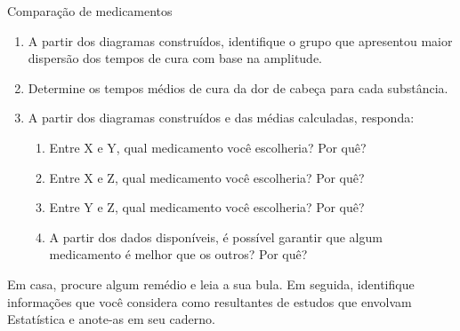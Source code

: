 \begin{task}{ Comparação de medicamentos}
\begin{enumerate}
\item {} 
A partir dos diagramas construídos, identifique o grupo que apresentou maior dispersão dos tempos de cura com base na amplitude.

\item {} 
Determine os tempos médios de cura da dor de cabeça para cada substância.

\item {} 
A partir dos diagramas construídos e das médias calculadas, responda:
\begin{enumerate}
\item Entre X e Y, qual medicamento você escolheria? Por quê?
\item Entre X e Z, qual medicamento você escolheria? Por quê?
\item Entre Y e Z, qual medicamento você escolheria? Por quê?
\item A partir dos dados disponíveis, é possível garantir que algum medicamento é melhor que os outros? Por quê?
\end{enumerate}
\end{enumerate}
\end{task}

\begin{research}

Em casa, procure algum remédio e leia a sua bula. Em seguida, identifique informações que você considera como resultantes de estudos que envolvam Estatística e anote-as em seu caderno.

\end{research}


